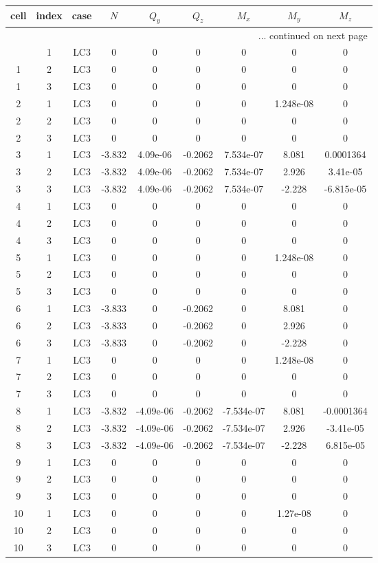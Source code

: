 \documentclass{article}%
\begin{document}
\begin{longtable}{| c c c | c c c c c c |}%
\hline%
cell&index&case&$N$&$Q_y$&$Q_z$&$M_x$&$M_y$&$M_z$\\%
\hline%
\endhead%
\hline%
\multicolumn{9}{r}{... continued on next page}\\%
\endfoot%
\hline%
\endlastfoot%
1&1&LC3&0&0&0&0&0&0\\%
1&2&LC3&0&0&0&0&0&0\\%
1&3&LC3&0&0&0&0&0&0\\%
2&1&LC3&0&0&0&0&1.248e{-}08&0\\%
2&2&LC3&0&0&0&0&0&0\\%
2&3&LC3&0&0&0&0&0&0\\%
3&1&LC3&{-}3.832&4.09e{-}06&{-}0.2062&7.534e{-}07&8.081&0.0001364\\%
3&2&LC3&{-}3.832&4.09e{-}06&{-}0.2062&7.534e{-}07&2.926&3.41e{-}05\\%
3&3&LC3&{-}3.832&4.09e{-}06&{-}0.2062&7.534e{-}07&{-}2.228&{-}6.815e{-}05\\%
4&1&LC3&0&0&0&0&0&0\\%
4&2&LC3&0&0&0&0&0&0\\%
4&3&LC3&0&0&0&0&0&0\\%
5&1&LC3&0&0&0&0&1.248e{-}08&0\\%
5&2&LC3&0&0&0&0&0&0\\%
5&3&LC3&0&0&0&0&0&0\\%
6&1&LC3&{-}3.833&0&{-}0.2062&0&8.081&0\\%
6&2&LC3&{-}3.833&0&{-}0.2062&0&2.926&0\\%
6&3&LC3&{-}3.833&0&{-}0.2062&0&{-}2.228&0\\%
7&1&LC3&0&0&0&0&1.248e{-}08&0\\%
7&2&LC3&0&0&0&0&0&0\\%
7&3&LC3&0&0&0&0&0&0\\%
8&1&LC3&{-}3.832&{-}4.09e{-}06&{-}0.2062&{-}7.534e{-}07&8.081&{-}0.0001364\\%
8&2&LC3&{-}3.832&{-}4.09e{-}06&{-}0.2062&{-}7.534e{-}07&2.926&{-}3.41e{-}05\\%
8&3&LC3&{-}3.832&{-}4.09e{-}06&{-}0.2062&{-}7.534e{-}07&{-}2.228&6.815e{-}05\\%
9&1&LC3&0&0&0&0&0&0\\%
9&2&LC3&0&0&0&0&0&0\\%
9&3&LC3&0&0&0&0&0&0\\%
10&1&LC3&0&0&0&0&1.27e{-}08&0\\%
10&2&LC3&0&0&0&0&0&0\\%
10&3&LC3&0&0&0&0&0&0\\%

\end{longtable}
\end{document}
